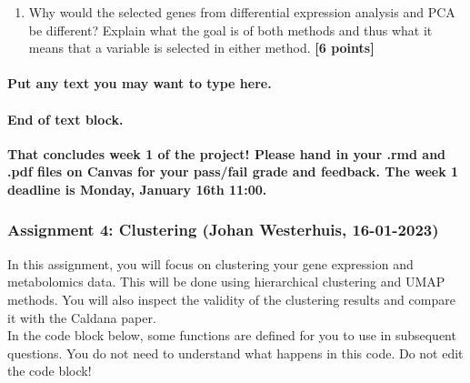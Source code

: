 \documentclass[
]{article}
\providecommand{\tightlist}{%
  \setlength{\itemsep}{0pt}\setlength{\parskip}{0pt}}
\begin{document}
\begin{enumerate}
\def\labelenumi{\Alph{enumi})}
\setcounter{enumi}{7}
\tightlist
\item
  Why would the selected genes from differential expression analysis and
  PCA be different? Explain what the goal is of both methods and thus
  what it means that a variable is selected in either method.
  \textbf{{[}6 points{]}}
\end{enumerate}

\hypertarget{put-any-text-you-may-want-to-type-here.-20}{%
\paragraph{Put any text you may want to type
here.}\label{put-any-text-you-may-want-to-type-here.-20}}

\hypertarget{end-of-text-block.-22}{%
\paragraph{\texorpdfstring{End of text block.\\
}{End of text block. }}\label{end-of-text-block.-22}}

\hfill\break
\textbf{That concludes week 1 of the project! Please hand in your .rmd
and .pdf files on Canvas for your pass/fail grade and feedback. The week
1 deadline is Monday, January 16th 11:00.}

\hypertarget{assignment-4-clustering-johan-westerhuis-16-01-2023}{%
\subsubsection{Assignment 4: Clustering (Johan Westerhuis,
16-01-2023)}\label{assignment-4-clustering-johan-westerhuis-16-01-2023}}

In this assignment, you will focus on clustering your gene expression
and metabolomics data. This will be done using hierarchical clustering
and UMAP methods. You will also inspect the validity of the clustering
results and compare it with the Caldana paper.\\

In the code block below, some functions are defined for you to use in
subsequent questions. You do not need to understand what happens in this
code. Do not edit the code block!
\end{document}

